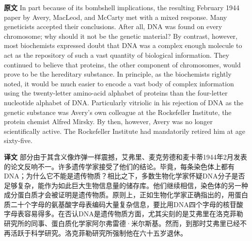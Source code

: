 \documentclass[UTF8,zihao=-4]{ctexart}
\newcommand{\BodyFont}{\fontsize{10.5pt}{15.5pt}\selectfont}
\renewenvironment{quote}{\par\noindent\begingroup\BodyFont}{\par\endgroup}
\begin{document}
\begin{quote}
\noindent\textbf{原文} In part because of its bombshell implications, the resulting February 1944 paper by Avery, MacLeod, and McCarty met with a mixed response. Many geneticists accepted their conclusions. After all, DNA was found on every chromosome; why should it not be the genetic material? By contrast, however, most biochemists expressed doubt that DNA was a complex enough molecule to act as the repository of such a vast quantity of biological information. They continued to believe that proteins, the other component of chromosomes, would prove to be the hereditary substance. In principle, as the biochemists rightly noted, it would be much easier to encode a vast body of complex information using the twenty-letter amino-acid alphabet of proteins than the four-letter nucleotide alphabet of DNA. Particularly vitriolic in his rejection of DNA as the genetic substance was Avery's own colleague at the Rockefeller Institute, the protein chemist Alfred Mirsky. By then, however, Avery was no longer scientifically active. The Rockefeller Institute had mandatorily retired him at age sixty-five.

\smallskip
\noindent\textbf{译文} 部分由于其含义像炸弹一样震撼，艾弗里、麦克劳德和麦卡蒂1944年2月发表的论文反响不一。许多遗传学家接受了他们的结论。毕竟，每条染色体上都有DNA；为什么它不能是遗传物质？相比之下，多数生物化学家怀疑DNA分子是否足够复杂，能作为如此巨大生物信息量的储存库。他们继续相信，染色体的另一种成分蛋白质才会被证明是遗传物质。原则上，正如生物化学家正确指出的，用蛋白质二十个字母的氨基酸字母表编码大量复杂信息，要比用DNA四个字母的核苷酸字母表容易得多。在否认DNA是遗传物质方面，尤其尖刻的是艾弗里在洛克菲勒研究所的同事、蛋白质化学家阿尔弗雷德·米尔斯基。然而，到那时艾弗里已经不再活跃于科学研究。洛克菲勒研究所强制他在六十五岁退休。
\end{quote}
\end{document}
